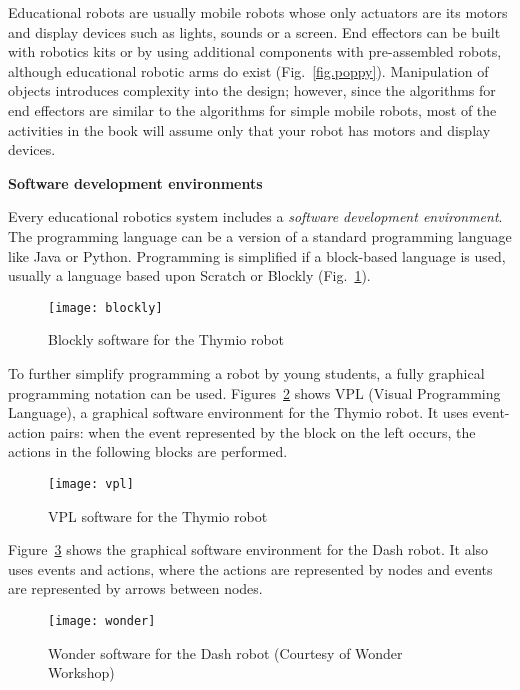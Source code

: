 Educational robots are usually mobile robots whose only actuators are its motors and display devices such as lights, sounds or a screen. End effectors can be built with robotics kits or by using additional components with pre-assembled robots, although educational robotic arms do exist (Fig.~\ref{fig.poppy}). Manipulation of objects introduces complexity into the design; however, since the algorithms for end effectors are similar to the algorithms for simple mobile robots, most of the activities in the book will assume only that your robot has motors and display devices.

\medskip

\noindent\textbf{Software development environments}

Every educational robotics system includes a \emph{software development environment}. The programming language can be a version of a standard programming language like Java or Python. Programming is simplified if a block-based language is used, usually a language based upon Scratch or Blockly (Fig.~\ref{fig.ide-blocks}).

\begin{figure}
\begin{center}
\texttt{[image: blockly]}
\end{center}
\caption{Blockly software for the Thymio robot}\label{fig.ide-blocks}
\end{figure}

To further simplify programming a robot by young students, a fully graphical programming notation can be used. Figures~\ref{fig.ide-thymio} shows VPL (Visual Programming Language), a graphical software environment for the Thymio robot. It uses event-action pairs: when the event represented by the block on the left occurs, the actions in the following blocks are performed.

\begin{figure}
\begin{center}
\texttt{[image: vpl]}
\end{center}
\caption{VPL software for the Thymio robot}\label{fig.ide-thymio}
\end{figure}

Figure~\ref{fig.ide-dash} shows the graphical software environment for the Dash robot. It also uses events and actions, where the actions are represented by nodes and events are represented by arrows between nodes.

\begin{figure}
\begin{center}
\texttt{[image: wonder]}
\end{center}
\caption{Wonder software for the Dash robot (Courtesy of Wonder Workshop)}\label{fig.ide-dash}
\end{figure}

